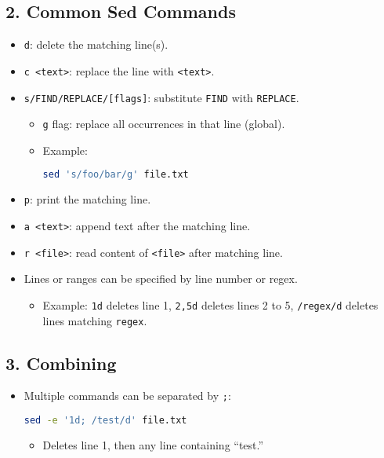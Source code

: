 \documentclass[a4paper]{report}
\begin{document}
\subsection*{2. Common Sed Commands}
\begin{itemize}
    \item \texttt{d}: delete the matching line(s).
    \item \texttt{c <text>}: replace the line with \texttt{<text>}.
    \item \texttt{s/FIND/REPLACE/[flags]}: substitute \texttt{FIND} with \texttt{REPLACE}.
        \begin{itemize}
            \item \texttt{g} flag: replace all occurrences in that line (global).
            \item Example:
\begin{lstlisting}[language=bash]
sed 's/foo/bar/g' file.txt
\end{lstlisting}
        \end{itemize}
    \item \texttt{p}: print the matching line.
    \item \texttt{a <text>}: append text after the matching line.
    \item \texttt{r <file>}: read content of \texttt{<file>} after matching line.
    \item Lines or ranges can be specified by line number or regex.
        \begin{itemize}
            \item Example: \texttt{1d} deletes line 1, \texttt{2,5d} deletes lines 2 to 5, \texttt{/regex/d} deletes lines matching \texttt{regex}.
        \end{itemize}
\end{itemize}

\subsection*{3. Combining}
\begin{itemize}
    \item Multiple commands can be separated by \texttt{;}:
\begin{lstlisting}[language=bash]
sed -e '1d; /test/d' file.txt
\end{lstlisting}
\begin{itemize}
    \item Deletes line 1, then any line containing “test.”
\end{itemize}
\end{itemize}
\end{document}

